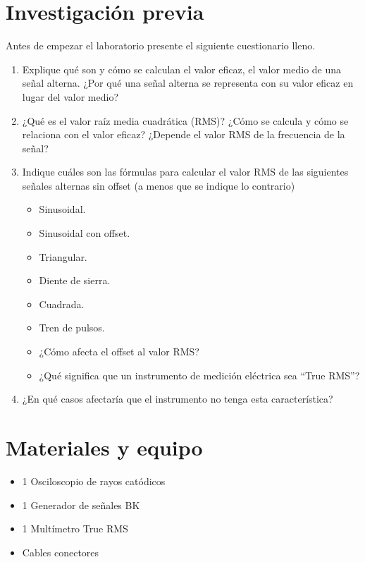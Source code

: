 \documentclass{report}
\newcommand{\inv}{Investigación previa}
\newcommand{\mat}{Materiales y equipo}
\newcommand{\antesde}{Antes de empezar el laboratorio presente el siguiente cuestionario lleno.}
\begin{document}
\section{\inv}
\antesde
\begin{enumerate}
\item Explique qué son y cómo se calculan el valor eficaz, el valor medio de una
señal alterna. ¿Por qué una señal alterna se representa con su valor eficaz
en lugar del valor medio?
\item ¿Qué es el valor raíz media cuadrática (RMS)? ¿Cómo se calcula y cómo se
relaciona con el valor eficaz? ¿Depende el valor RMS de la frecuencia de la
señal?
\item Indique cuáles son las fórmulas para calcular el valor RMS de las siguientes
señales alternas sin offset (a menos que se indique lo contrario)

\begin{itemize}
\item Sinusoidal.
\item Sinusoidal con offset.
\item Triangular.
\item Diente de sierra.
\item Cuadrada.
\item Tren de pulsos.
\item ¿Cómo afecta el offset al valor RMS?
\item ¿Qué significa que un instrumento de medición eléctrica sea “True RMS”?
\end{itemize}

\item ¿En qué casos afectaría que el instrumento no tenga esta característica?
\end{enumerate}

\section{\mat}
\begin{itemize}
\item 1 Osciloscopio de rayos catódicos
\item 1 Generador de señales BK
\item 1 Multímetro True RMS
\item Cables conectores
\end{itemize}
\end{document}
